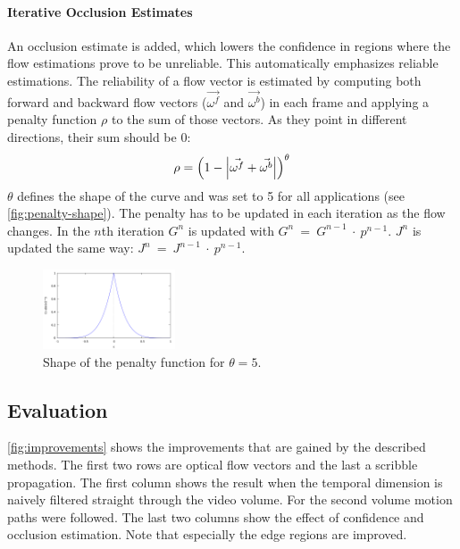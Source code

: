 \documentclass{utue} %
\begin{document}
\paragraph{Iterative Occlusion Estimates} \label{iterative-occlusion-estimates}
An occlusion estimate is added, which lowers the confidence in regions where
the flow estimations prove to be unreliable. This automatically emphasizes
reliable estimations. The reliability of a flow vector is estimated by
computing both forward and backward flow vectors ($\vec{\omega^f}$ and
$\vec{\omega^b}$) in each frame and applying a penalty function $\rho$ to the
sum of those vectors. As they point in different directions, their sum should
be 0:
\begin{equation}
  \rho = \left(1-\left| \vec{\omega^f} + \vec{\omega^b} \right|\right)^{\theta}
  \label{eq:penalty}
\end{equation}
$\theta$ defines the shape of the curve and was set to 5 for all applications
(see \autoref{fig:penalty-shape}).
The penalty has to be updated in each iteration as the flow changes. In the
$n$th iteration $G^n$ is updated with $G^n~=~G^{n-1}~\cdot~p^{n-1}$. $J^n$ is
updated the same way: $J^n~=~J^{n-1}~\cdot~p^{n-1}$.

\begin{figure}[htb]
  \centering
  \includegraphics[width=0.35\textwidth]{images/penalty.png}
  \caption{Shape of the penalty function for $\theta = 5$.}
  \label{fig:penalty-shape}
\end{figure}

\subsection{Evaluation} \label{evaluation}
\autoref{fig:improvements} shows the improvements that are gained by the
described methods. The first two rows are optical flow vectors and the last a
scribble propagation. The first column shows the result when the temporal
dimension is naively filtered straight through the video volume. For the second
volume motion paths were followed. The last two columns show the effect of
confidence and occlusion estimation. Note that especially the edge regions are
improved.
\end{document}
